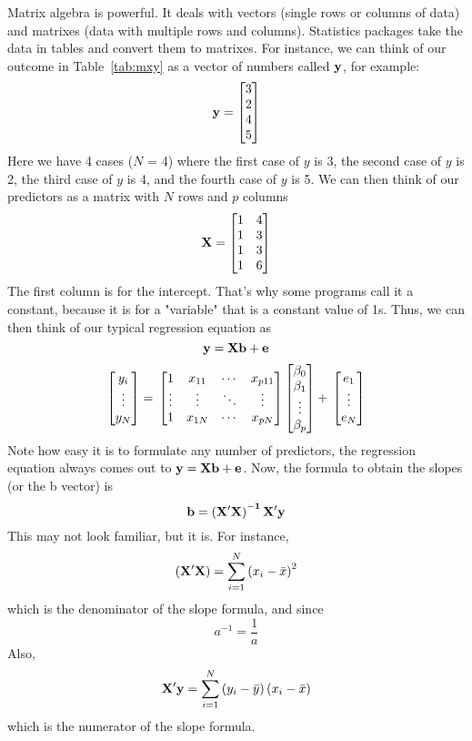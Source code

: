Matrix algebra is powerful. It deals with vectors (single rows or columns of data) and matrixes (data with multiple rows and columns). Statistics packages take the data in tables and convert them to matrixes. For instance, we can think of our outcome in Table~\ref{tab:mxy} as a vector of numbers called ${\bf{y}}$, for example:
\[
{\bf{y}}=
\begin{bmatrix}
3 \\
2 \\
4 \\
5 \\
\end{bmatrix}
\]
Here we have 4 cases ($N$ = 4) where the first case of $y$ is 3, the second case of $y$ is 2, the third case of $y$ is 4, and the fourth case of $y$ is 5. We can then think of our predictors as a matrix with $N$ rows and $p$ columns
\[
{\bf{X}}=
\begin{bmatrix}
1&4 \\
1&3 \\
1&3 \\
1&6 \\
\end{bmatrix}
\]
The first column is for the intercept. That's why some programs call it a constant, because it is for a "variable" that is a constant value of 1s. Thus, we can then think of our typical regression equation as
\begin{equation}\label{eq:matrixolsmodel}
{\bf{y=Xb+e}}
\end{equation}
\[
\begin{bmatrix}
y_i \\
\vdots \\
y_N \\
\end{bmatrix}
= \\
\begin{bmatrix}
1&x_{11}&\cdots&x_{p11} \\
\vdots&\vdots&\ddots&\vdots \\
1&x_{1N}&\cdots&x_{pN} \\
\end{bmatrix}
\begin{bmatrix}
\beta_0 \\
\beta_1 \\
\vdots \\
\beta_p \\
\end{bmatrix}
+ \\
\begin{bmatrix}
e_1 \\
\vdots \\
e_N \\
\end{bmatrix}
\]
Note how easy it is to formulate any number of predictors, the regression equation always comes out to ${\bf{y=Xb+e}}$. Now, the formula to obtain the slopes (or the b vector) is
\[
{\bf{b=\left(X'X\right)^{-1}X'y}}
\]
This may not look familiar, but it is. For instance,
\[
{\bf{\left(X'X\right)}}=\sum_{i=1}^N\left(x_i-\bar{x}\right)^2
\]
which is the denominator of the slope formula, and since
\[
a^{-1} = \frac{1}{a}
\]
Also,
\[
{\bf{X'y}} =\sum_{i=1}^N\left(y_i-\bar{y}\right)\left(x_i-\bar{x}\right)
\]
which is the numerator of the slope formula.

